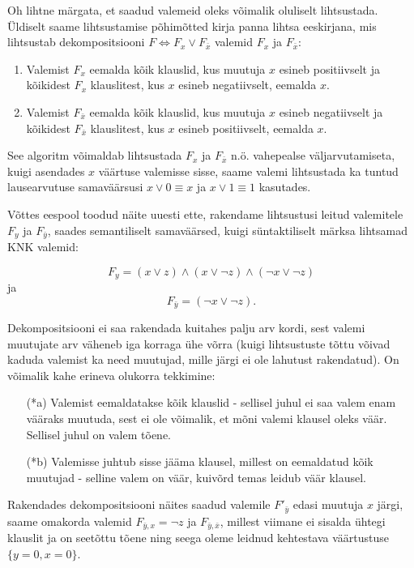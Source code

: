 Oh lihtne märgata, et saadud valemeid oleks võimalik oluliselt lihtsustada.
Üldiselt saame lihtsustamise põhimõtted kirja panna lihtsa eeskirjana, mis
lihtsustab dekompositsiooni $F \Leftrightarrow F_x \vee F_{\bar{x}}$ valemid
$F_x$ ja $F_{\bar{x}}$:

\begin{enumerate}
  \item Valemist $F_x$ eemalda kõik klauslid, kus muutuja $x$ esineb
  positiivselt ja kõikidest $F_x$ klauslitest, kus $x$ esineb negatiivselt,
  eemalda $x$.
  \item Valemist $F_{\bar{x}}$ eemalda kõik klauslid, kus muutuja $x$ esineb
  negatiivselt ja kõikidest $F_{\bar{x}}$ klauslitest, kus $x$ esineb positiivselt,
  eemalda $x$.
\end{enumerate}

See algoritm võimaldab lihtsustada $F_x$ ja $F_{\bar{x}}$ n.ö. vahepealse
väljarvutamiseta, kuigi asendades $x$ väärtuse valemisse sisse, saame valemi
lihtsustada ka tuntud lausearvutuse samaväärsusi $x\vee 0 \equiv x$ ja $x\vee 1
\equiv 1$ kasutades.

Võttes eespool toodud näite uuesti ette, rakendame lihtsustusi leitud valemitele
$F_y$ ja $F_{\bar{y}}$, saades semantiliselt samaväärsed, kuigi süntaktiliselt
märksa lihtsamad KNK valemid:

$$F_y=(x\vee z)\wedge (x\vee\neg z)\wedge(\neg x\vee\neg z)$$
ja
$$F_{\bar{y}}=(\neg x\vee\neg z).$$

Dekompositsiooni ei saa rakendada kuitahes palju arv kordi, sest
valemi muutujate arv väheneb iga korraga ühe võrra (kuigi lihtsustuste
tõttu võivad kaduda valemist ka need muutujad, mille järgi ei ole lahutust
rakendatud). On võimalik kahe erineva olukorra tekkimine:

\begin{enumerate}
  \item[(*a)] Valemist eemaldatakse kõik klauslid - sellisel juhul ei saa valem
  enam vääraks muutuda, sest ei ole võimalik, et mõni valemi klausel oleks
  väär. Sellisel juhul on valem tõene.
  \item[(*b)] Valemisse juhtub sisse jääma klausel, millest on eemaldatud kõik
  muutujad - selline valem on väär, kuivõrd temas leidub väär klausel.
\end{enumerate}

Rakendades dekompositsiooni näites saadud valemile $F'_{\bar{y}}$ edasi muutuja
$x$ järgi, saame omakorda valemid $F_{\bar{y},x}=\neg z$ ja
$F_{\bar{y},\bar{x}}$, millest viimane ei sisalda ühtegi klauslit ja on
seetõttu tõene ning seega oleme leidnud kehtestava väärtustuse
$\{y=0,x=0\}$.

